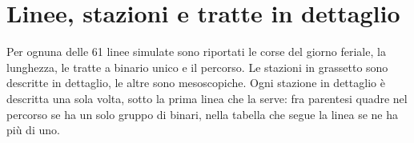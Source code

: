 \documentclass[11pt,a4paper]{article}
\begin{document}
\printbibliography[heading=bibintoc]

\clearpage
\appendix
\section{Linee, stazioni e tratte in dettaglio}
\label{app:linee}
Per ognuna delle 61 linee simulate sono riportati le corse del giorno feriale, la lunghezza, le tratte a binario unico e il percorso. Le stazioni in grassetto sono descritte in dettaglio, le altre sono mesoscopiche. Ogni stazione in dettaglio è descritta una sola volta, sotto la prima linea che la serve: fra parentesi quadre nel percorso se ha un solo gruppo di binari, nella tabella che segue la linea se ne ha più di uno.

{\small

}
\end{document}
